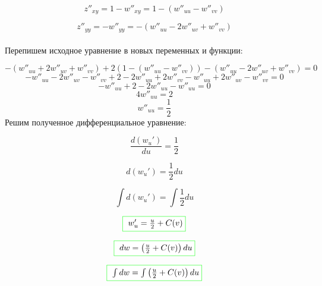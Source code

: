 \documentclass[a5paper, 10pt]{article}
\theoremstyle{definition}
\theoremstyle{plain}
\theoremstyle{remark}
\begin{document}
\begin{equation}
z''_{xy} = 1 - w''_{xy} = 1 - ( w''_{uu} -  w''_{vv})
\end{equation}

\begin{equation}
z''_{yy} = - w''_{yy} = -( w''_{uu} - 2w''_{uv} + w''_{vv})
\end{equation}
\\
Перепишем исходное уравнение в новых переменных и функции:

\begin{equation}
- ( w''_{uu} + 2w''_{uv} + w''_{vv}) + 2 (1 - ( w''_{uu} -  w''_{vv})) -( w''_{uu} - 2w''_{uv} + w''_{vv}) = 0
\end{equation}
\begin{equation}
- w''_{uu} - 2w''_{uv} - w''_{vv} + 2 -2  w''_{uu} +2  w''_{vv} - w''_{uu} + 2w''_{uv} - w''_{vv} = 0
\end{equation}
\begin{equation}
- w''_{uu}  + 2 -2  w''_{uu}  - w''_{uu}   = 0
\end{equation}
\begin{equation}
4 w''_{uu}  = 2
\end{equation}
\begin{equation}
 w''_{uu}  = \frac{1}{2}
\end{equation}
Решим полученное дифференциальное уравнение:

\begin{equation}
 \frac{d(w_u')}{du}  = \frac{1}{2}
\end{equation}

\begin{equation}
 d(w_u')  = \frac{1}{2} du
\end{equation}

\begin{equation}
 \int d(w_u')  = \int \frac{1}{2} du
\end{equation}

\begin{equation}
\fcolorbox{green}{white}{ $w_u' =  \frac{u}{2} + C(v)$}
\end{equation}

\begin{equation}
 \fcolorbox{green}{white}{ $dw = \left( \frac{u}{2} + C(v) \right) du $}
\end{equation}

\begin{equation}
 \fcolorbox{green}{white}{ $\int dw =\int  \left( \frac{u}{2} + C (v) \right) du$}
\end{equation}
\end{document}
